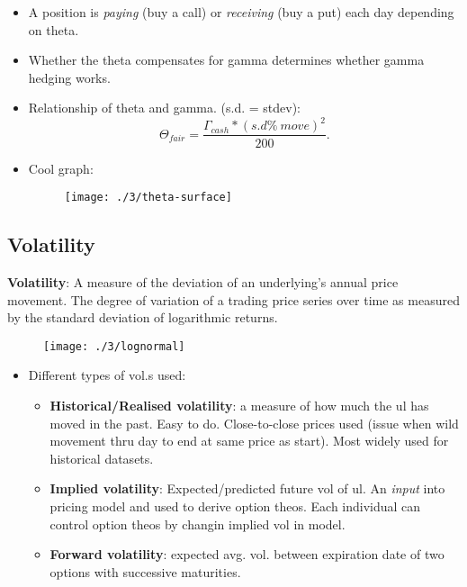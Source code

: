 \documentclass{article}
\begin{document}
\begin{itemize}
    \item A position is \textit{paying} (buy a call) or \textit{receiving} (buy
    a put) each day
    depending on theta.
    \item Whether the theta compensates for gamma determines whether gamma
    hedging works.
    \item Relationship of theta and gamma. (s.d. = stdev):
    \begin{equation*}
        \Theta_{fair} = \frac{\Gamma_{cash}*(s.d \% \ move)^2}{200}.
    \end{equation*}
    \newpage
    \item Cool graph:
    \begin{figure}[h]
        \texttt{[image: ./3/theta-surface]}
        \centering
    \end{figure}
\end{itemize}

\subsection{Volatility}
\textbf{Volatility}: A measure of the deviation of an underlying's annual price
movement. The degree of variation of a trading price series over time as
measured by the standard deviation of logarithmic returns.

\begin{figure}[h]
    \texttt{[image: ./3/lognormal]}
    \centering
\end{figure}

\begin{itemize}
    \item Different types of vol.s used:
    \begin{itemize}
        \item \textbf{Historical/Realised volatility}: a measure of how much the
        ul has moved in the past. Easy to do. Close-to-close prices used (issue
        when wild movement thru day to end at same price as start). Most widely
        used for historical datasets.
        \item \textbf{Implied volatility}: Expected/predicted future vol of ul.
        An \textit{input} into pricing model and used to derive option theos.
        Each individual can control option theos by changin implied vol in
        model.
        \item \textbf{Forward volatility}: expected avg. vol. between expiration
        date of two options with successive maturities.
    \end{itemize}
\end{itemize}
\end{document}
